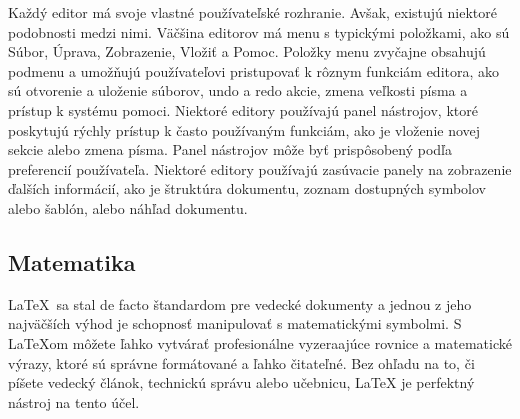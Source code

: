 \documentclass[a4paper, 11pt]{article}
\begin{document}
Každý editor má svoje vlastné používateľské rozhranie. Avšak, existujú niektoré podobnosti medzi nimi. Väčšina editorov má menu s typickými položkami, ako sú Súbor, Úprava, Zobrazenie, Vložiť a Pomoc. Položky menu zvyčajne obsahujú podmenu a umožňujú používateľovi pristupovať k rôznym funkciám editora, ako sú otvorenie a uloženie súborov, undo a redo akcie, zmena veľkosti písma a prístup k systému pomoci. Niektoré editory používajú panel nástrojov, ktoré poskytujú rýchly prístup k často používaným funkciám, ako je vloženie novej sekcie alebo zmena písma. Panel nástrojov môže byť prispôsobený podľa preferencií používateľa. Niektoré editory používajú zasúvacie panely na zobrazenie ďalších informácií, ako je štruktúra dokumentu, zoznam dostupných symbolov alebo šablón, alebo náhľad dokumentu. \cite{HorejsiTomas2017}


\subsection{Matematika}
\LaTeX \ sa stal de facto štandardom pre vedecké dokumenty a jednou z jeho najväčších výhod je schopnosť manipulovať s matematickými symbolmi. S LaTeXom môžete ľahko vytvárať profesionálne vyzeraajúce rovnice a matematické výrazy, ktoré sú správne formátované a ľahko čitateľné. Bez ohľadu na to, či píšete vedecký článok, technickú správu alebo učebnicu, LaTeX je perfektný nástroj na tento účel. \cite{WeiserTexMatematics}














\newpage

\renewcommand{\refname}{Literatúra}

\end{document}

